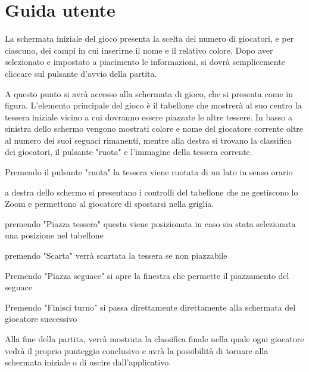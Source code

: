 \section{Guida utente}
La schermata iniziale del gioco presenta la scelta del numero di giocatori, e per ciascuno, dei campi in cui inserirne il nome e il relativo colore. Dopo aver selezionato e impostato a piacimento le informazioni, si dovrà semplicemente cliccare sul pulsante d'avvio della partita.

A questo punto si avrà accesso alla schermata di gioco, che si presenta come in figura. L'elemento principale del gioco è il tabellone che mostrerà al suo centro la tessera iniziale vicino a cui dovranno essere piazzate le altre tessere. In basso a sinistra dello schermo vengono mostrati colore e nome del giocatore corrente oltre al numero dei suoi seguaci rimanenti, mentre alla destra si trovano la classifica dei giocatori, il pulsante "ruota" e l'immagine della tessera corrente.

Premendo il pulsante "ruota" la tessera viene ruotata di un lato in senso orario

a destra dello schermo si presentano i controlli del tabellone che ne gestiscono lo Zoom e permettono al giocatore di spostarsi nella griglia.

premendo "Piazza tessera" questa viene posizionata in caso sia stata selezionata una posizione nel tabellone

premendo "Scarta" verrà scartata la tessera se non piazzabile

Premendo "Piazza seguace" si apre la finestra che permette il piazzamento del seguace

Premendo "Finisci turno" si passa direttamente direttamente alla schermata del giocatore successivo






Alla fine della partita, verrà mostrata la classifica finale nella quale ogni giocatore vedrà il proprio punteggio conclusivo e avrà la possibilità di tornare alla schermata iniziale o di uscire dall'applicativo. 